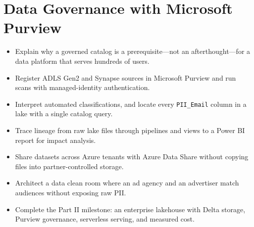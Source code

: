 \chapter{Data Governance with Microsoft Purview}
%
\begin{objectives}
\begin{itemize}
    \item Explain why a governed catalog is a prerequisite---not an afterthought---for a data platform that serves hundreds of users.
    \item Register ADLS Gen2 and Synapse sources in Microsoft Purview and run scans with managed-identity authentication.
    \item Interpret automated classifications, and locate every \texttt{PII\_Email} column in a lake with a single catalog query.
    \item Trace lineage from raw lake files through pipelines and views to a Power BI report for impact analysis.
    \item Share datasets across Azure tenants with Azure Data Share without copying files into partner-controlled storage.
    \item Architect a data clean room where an ad agency and an advertiser match audiences without exposing raw PII.
    \item Complete the Part II milestone: an enterprise lakehouse with Delta storage, Purview governance, serverless serving, and measured cost.
\end{itemize}
\end{objectives}

